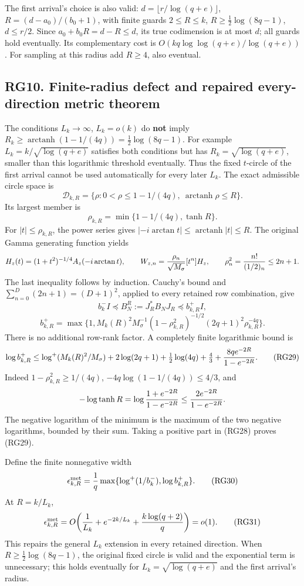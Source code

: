 \documentclass[11pt]{article}
\begin{document}
The first arrival's choice is also valid: \(d=\lfloor r/\log(q+e)\rfloor\), \(R=(d-a_0)/(b_0+1)\), with finite guards \(2\le R\le k\), \(R\ge\frac12\log(8q-1)\), \(d\le r/2\). Since \(a_0+b_0R=d-R\le d\), its true codimension is at most \(d\); all guards hold eventually. Its complementary cost is \(O(kq\log\log(q+e)/\log(q+e))\). For sampling at this radius add \(R\ge4\), also eventual.

\subsection{RG10. Finite-radius defect and repaired every-direction metric theorem}\label{rg10.-finite-radius-defect-and-repaired-every-direction-metric-theorem}

The conditions \(L_k\to\infty\), \(L_k=o(k)\) do \textbf{not} imply \(R_k\ge\operatorname{arctanh}(1-1/(4q))=\frac12\log(8q-1)\). For example \(L_k=k/\sqrt{\log(q+e)}\) satisfies both conditions but has \(R_k=\sqrt{\log(q+e)}\), smaller than this logarithmic threshold eventually. Thus the fixed \(t\)-circle of the first arrival cannot be used automatically for every later \(L_k\). The exact admissible circle space is \[
\mathcal D_{k,R}=\{\rho:0<\rho\le1-1/(4q),\
\operatorname{arctanh}\rho\le R\}.
\] Its largest member is \[
\rho_{k,R}=\min\{1-1/(4q),\tanh R\}.
\tag{RG27}
\] For \(|t|\le\rho_{k,R}\), the power series gives \(|-i\arctan t|\le\operatorname{arctanh}|t|\le R\). The original Gamma generating function yields \[
H_z(t)=(1+t^2)^{-1/4}A_z(-i\arctan t),\qquad
W_{z,n}={\rho_n\over\sqrt{M_\sigma}}[t^n]H_z,\qquad
\rho_n^2={n!\over(1/2)_n}\le2n+1.
\] The last inequality follows by induction. Cauchy's bound and \(\sum_{n=0}^D(2n+1)=(D+1)^2\), applied to every retained row combination, give \[
b_k^-I\preceq B_N^R:=J_R^*B_NJ_R\preceq b^+_{k,R}I,
\] \[
b^+_{k,R}=\max\{1,M_k(R)^2M_\sigma^{-1}
(1-\rho_{k,R}^2)^{-1/2}(2q+1)^2\rho_{k,R}^{-4q}\}.
\tag{RG28}
\] There is no additional row-rank factor. A completely finite logarithmic bound is \[
\log b^+_{k,R}\le
\log^+(M_k(R)^2/M_\sigma)+2\log(2q+1)+\tfrac12\log(4q)
+\tfrac43+{8q e^{-2R}\over1-e^{-2R}}.
\tag{RG29}
\] Indeed \(1-\rho_{k,R}^2\ge1/(4q)\), \(-4q\log(1-1/(4q))\le4/3\), and \[
-\log\tanh R=\log{1+e^{-2R}\over1-e^{-2R}}
\le{2e^{-2R}\over1-e^{-2R}}.
\] The negative logarithm of the minimum is the maximum of the two negative logarithms, bounded by their sum. Taking a positive part in (RG28) proves (RG29).

Define the finite nonnegative width \[
\epsilon_{k,R}^{\rm met}={1\over q}
\max\{\log^+(1/b_k^-),\log b^+_{k,R}\}.
\tag{RG30}
\] At \(R=k/L_k\), \[
\epsilon_{k,R}^{\rm met}
=O\!\left({1\over L_k}+e^{-2k/L_k}+{k\log(q+2)\over q}\right)=o(1).
\tag{RG31}
\] This repairs the general \(L_k\) extension in every retained direction. When \(R\ge\frac12\log(8q-1)\), the original fixed circle is valid and the exponential term is unnecessary; this holds eventually for \(L_k=\sqrt{\log(q+e)}\) and the first arrival's radius.
\end{document}
